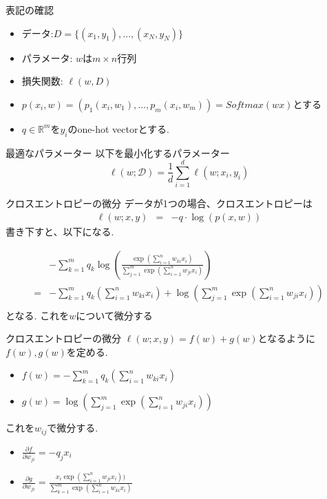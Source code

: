 \begin{frame}{表記の確認}
  \begin{itemize}
\item データ:$D =  \{(x_1, y_1), \ldots, (x_N, y_N)\}$
\item パラメータ: $w$は$m \times n$行列
\item 損失関数: $\ell(w, D)$
\item $p(x_i, w) = (p_1(x_i, w_1), \ldots, p_m(x_i, w_m)) = Softmax(wx)$とする
\item $q \in \mathbb{R}^m$を$y_i$のone-hot vectorとする.
  \end{itemize}
\end{frame}

\begin{frame}{最適なパラメーター}
以下を最小化するパラメーター
$$
\displaystyle \ell(w;\mathcal{D}) = \frac{1}{d}\sum_{i=1}^{d}\ell(w;x_i, y_i)
$$
\end{frame}

\begin{frame}{クロスエントロピーの微分}
データが1つの場合、クロスエントロピーは
\begin{eqnarray*}
\ell(w;x,y) &=& - q \cdot \log(p(x, w))
\end{eqnarray*}
書き下すと、以下になる.

\begin{align*}
&  -\sum_{k=1}^m q_k \log \left( \frac{ \exp(\sum_{i=1}^n w_{ki}x_i)}{\sum_{j=1}^m \exp(\sum_{i=1}^n w_{ji}x_i)} \right) \\
= &- \sum_{k=1}^m q_k (\sum_{i=1}^n w_{ki}x_i) + \log(\sum_{j=1}^m \exp(\sum_{i=1}^n w_{ji}x_i))  \\
\end{align*}
となる.
これを$w$について微分する
\end{frame}

\begin{frame}{クロスエントロピーの微分}
$\ell(w;x, y) = f(w) + g(w)$となるように$f(w), g(w)$を定める.
\begin{itemize}
\item $f(w) = - \sum_{k=1}^m q_k (\sum_{i=1}^n w_{ki}x_i)$
\item $g(w) = \log(\sum_{j=1}^m \exp(\sum_{i=1}^n w_{ji}x_i))$
\end{itemize}

これを$w_{ij}$で微分する.
\begin{itemize}
\item $\frac{\partial f}{\partial w_{ji}} = -  q_j x_i$
\item $\frac{\partial g}{\partial w_{ji}} = \frac{x_i \exp(\sum_{i=1}^n w_{ji}x_i))}{\sum_{k=1}^m \exp(\sum_{i=1}^n w_{ki}x_i)}$
\end{itemize}
\end{frame}


